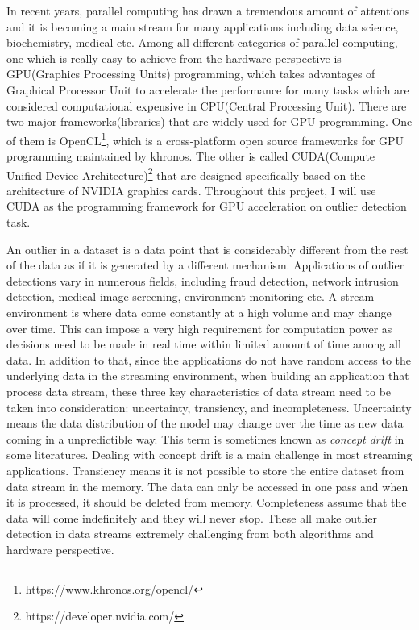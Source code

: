\documentclass[11pt]{article}       %
\begin{document}
In recent years, parallel computing has drawn a tremendous amount of attentions and it is becoming a main stream for many applications including data science, biochemistry, medical etc. Among all different categories of parallel computing, one which is really easy to achieve from the hardware perspective is GPU(Graphics Processing Units) programming, which takes advantages of Graphical Processor Unit to accelerate the performance for many tasks which are considered computational expensive in CPU(Central Processing Unit). 
There are two major frameworks(libraries) that are widely used for GPU programming. One of them is OpenCL\footnote{https://www.khronos.org/opencl/}, which is a cross-platform open source frameworks for GPU programming maintained by khronos. The other is called CUDA(Compute Unified Device Architecture)\footnote{https://developer.nvidia.com/} that are designed specifically based on the architecture of NVIDIA graphics cards. Throughout this project, I will use CUDA as the programming framework for GPU acceleration on outlier detection task.  

An outlier in a dataset is a data point that is considerably different from the rest of the data as if it is generated by a different mechanism\cite{7516110}. Applications of outlier detections vary in numerous fields, including fraud detection, network intrusion detection, medical image screening, environment monitoring etc. A stream environment is where data come constantly at a high volume and may change over time. This can impose a very high requirement for computation power as decisions need to be made in real time within limited amount of time among all data. In addition to that, since the applications do not have random access to the underlying data in the streaming environment, when building an application that process data stream, these three key characteristics of data stream need to be taken into consideration: uncertainty, transiency, and incompleteness\cite{Sadik:2011:OOD:2076623.2076635}. Uncertainty means the data distribution of the model may change over the time as new data coming in a unpredictible way. This term is sometimes known as \textit{concept drift} in some literatures. Dealing with concept drift is a main challenge in most streaming applications. Transiency means it is not possible to store the entire dataset from data stream in the memory. The data can only be accessed in one pass and when it is processed, it should be deleted from memory. Completeness assume that the data will come indefinitely and they will never stop. These all make outlier detection in data streams extremely challenging from both algorithms and hardware perspective. 
\end{document}
